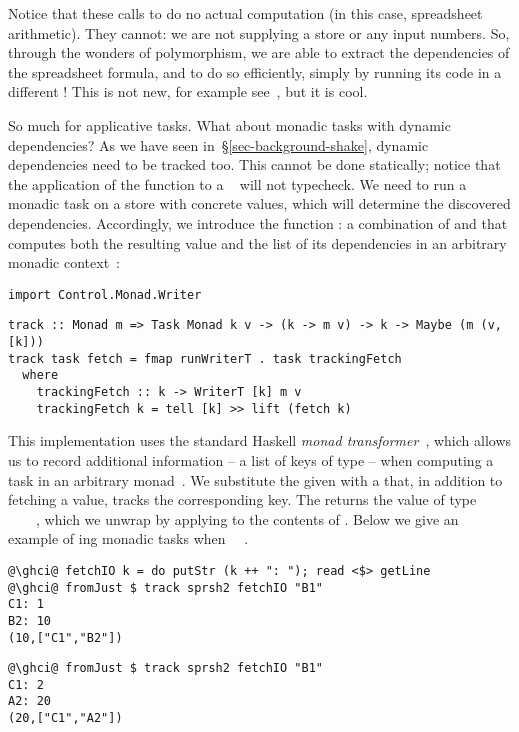 \noindent
Notice that these calls to  do no actual computation (in this
case, spreadsheet arithmetic). They cannot: we are not supplying a store or any
input numbers. So, through the wonders of polymorphism, we are able to extract
the dependencies of the spreadsheet formula, and to do so efficiently, simply by
running its code in a different ! This is not new, for example
see~\cite{free-applicatives}, but it is cool.

So much for applicative tasks. What about monadic tasks with dynamic
dependencies? As we have seen in~\S\ref{sec-background-shake}, dynamic
dependencies need to be tracked too. This cannot be done statically; notice that
the application of the function  to a ~ will
not typecheck. We need to run a monadic task on a store with concrete values,
which will determine the discovered dependencies. Accordingly, we introduce
the function : a combination of  and 
that computes both the resulting value and the list of its dependencies in an
arbitrary monadic context~:

\vspace{1mm}
\begin{verbatim}
import Control.Monad.Writer
\end{verbatim}
\vspace{0.5mm}
\begin{verbatim}
track :: Monad m => Task Monad k v -> (k -> m v) -> k -> Maybe (m (v, [k]))
track task fetch = fmap runWriterT . task trackingFetch
  where
    trackingFetch :: k -> WriterT [k] m v
    trackingFetch k = tell [k] >> lift (fetch k)
\end{verbatim}
\vspace{1mm}

\noindent
This implementation uses the standard Haskell  \emph{monad
transformer}~\cite{liang1995monad}, which allows us
to record additional information -- a list of keys of type \hs{[@@k]} -- when
computing a task in an arbitrary monad~. We substitute the given 
with a  that, in addition to fetching a value, tracks the
corresponding key. The  returns the value of type
~~\hs{[@@k]}~~, which we unwrap by applying
 to the contents of .
Below we give an example of ing monadic tasks when ~\hs{=}~.

\vspace{1mm}
\begin{verbatim}
@\ghci@ fetchIO k = do putStr (k ++ ": "); read <$> getLine
@\ghci@ fromJust $ track sprsh2 fetchIO "B1"
C1: 1
B2: 10
(10,["C1","B2"])
\end{verbatim}
\vspace{1mm}
\begin{verbatim}
@\ghci@ fromJust $ track sprsh2 fetchIO "B1"
C1: 2
A2: 20
(20,["C1","A2"])
\end{verbatim}
\vspace{1mm}

